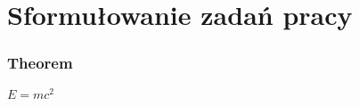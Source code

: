 \section{Sformułowanie zadań pracy}

\begin{frame}
    \frametitle{Theorem}
    \begin{theorem}
    $E = mc^2$
    \end{theorem}
\end{frame}